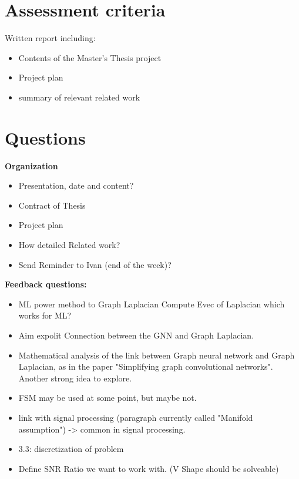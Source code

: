 \chapter{Assessment criteria}
Written report including: 
\begin{itemize}
    \item Contents of the Master's Thesis project
    \item Project plan
    \item summary of relevant related work
\end{itemize}

\chapter{Questions}


\textbf{Organization}
\begin{itemize}
    \item Presentation, date and content?
    \item Contract of Thesis
    \item Project plan
    \item How detailed Related work?
    \item Send Reminder to Ivan (end of the week)?
\end{itemize}

\textbf{Feedback questions:}
\begin{itemize}
    \item ML power method to Graph Laplacian
        Compute Evec of Laplacian which works for ML?
    \item Aim expolit Connection between the GNN and Graph Laplacian.
    \item Mathematical analysis of the link between Graph neural network and Graph Laplacian, as in the paper "Simplifying graph convolutional networks". Another strong idea to explore.
    \item FSM may be used at some point, but maybe not.
    \item link with signal processing (paragraph currently called "Manifold assumption") -> common in signal processing.
    \item 3.3: discretization of problem
    \item Define SNR Ratio we want to work with. (V Shape should be solveable)

\end{itemize}
